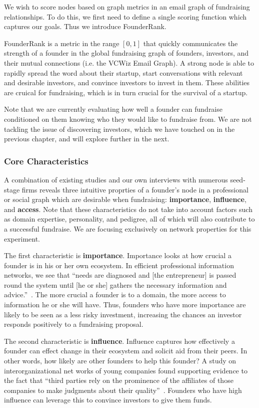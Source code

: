 We wish to score nodes based on graph metrics in an email graph of fundraising relationships. To do this, we first need to define a single scoring function which captures our goals. Thus we introduce FounderRank.

FounderRank is a metric in the range $[0, 1]$ that quickly communicates the strength of a founder in the global fundraising graph of founders, investors, and their mutual connections (i.e. the VCWiz Email Graph). A strong node is able to rapidly spread the word about their startup, start conversations with relevant and desirable investors, and convince investors to invest in them. These abilities are cruical for fundraising, which is in turn crucial for the survival of a startup.

Note that we are currently evaluating how well a founder can fundraise conditioned on them knowing who they would like to fundraise from. We are not tackling the issue of discovering investors, which we have touched on in the previous chapter, and will explore further in the next.

\subsubsection{Core Characteristics}

A combination of existing studies and our own interviews with numerous seed-stage firms reveals three intuitive proprties of a founder's node in a professional or social graph which are desirable when fundraising: \textbf{importance}, \textbf{influence}, and \textbf{access}. Note that these characteristics do not take into account factors such as domain expertise, personality, and pedigree, all of which will also contribute to a successful fundraise. We are focusing exclusively on network properties for this experiment.

The first characteristic is \textbf{importance}. Importance looks at how crucial a founder is in his or her own ecosystem. In efficient professional information networks, we see that ``needs are diagnosed and [the entrepreneur] is passed round the system until [he or she] gathers the necessary information and advice.''~\cite{BIRLEY1985107}. The more crucial a founder is to a domain, the more access to information he or she will have. Thus, founders who have more importance are likely to be seen as a less risky investment, increasing the chances an investor responds positively to a fundraising proposal.

The second characteristic is \textbf{influence}. Influence captures how effectively a founder can effect change in their ecosystem and solicit aid from their peers. In other words, how likely are other founders to help this founder? A study on interorganizational net
works of young companies found supporting evidence to the fact that ``third parties rely on the prominence of the affiliates of those companies to make judgments about their quality''~\cite{10.2307/2666998}. Founders who have high influence can leverage this to convince investors to give them funds.

